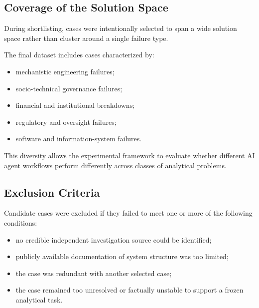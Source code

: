 \subsection{Coverage of the Solution Space}

During shortlisting, cases were intentionally selected to span a wide
solution space rather than cluster around a single failure type.

The final dataset includes cases characterized by:

\begin{itemize}

\item mechanistic engineering failures;

\item socio-technical governance failures;

\item financial and institutional breakdowns;

\item regulatory and oversight failures;

\item software and information-system failures.

\end{itemize}

This diversity allows the experimental framework to evaluate whether
different AI agent workflows perform differently across classes of
analytical problems.

\subsection{Exclusion Criteria}

Candidate cases were excluded if they failed to meet one or more of the
following conditions:

\begin{itemize}

\item no credible independent investigation source could be identified;

\item publicly available documentation of system structure was too limited;

\item the case was redundant with another selected case;

\item the case remained too unresolved or factually unstable to support a
frozen analytical task.

\end{itemize}

